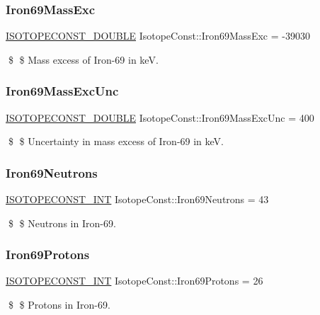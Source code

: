 \subsubsection{\texorpdfstring{Iron69\+Mass\+Exc}{Iron69MassExc}}
{\footnotesize\ttfamily \mbox{\hyperlink{group___isotope_const-_macros_ga8f45a7272ce02c0b4c65c44636ed719a}{I\+S\+O\+T\+O\+P\+E\+C\+O\+N\+S\+T\+\_\+\+D\+O\+U\+B\+LE}} Isotope\+Const\+::\+Iron69\+Mass\+Exc = -\/39030}

\$ \$ Mass excess of Iron-\/69 in keV. \mbox{\label{group___isotope_const-_iron-_fe69_ga04de5f66e578598bd93490f76d42a4e3}} 
\subsubsection{\texorpdfstring{Iron69\+Mass\+Exc\+Unc}{Iron69MassExcUnc}}
{\footnotesize\ttfamily \mbox{\hyperlink{group___isotope_const-_macros_ga8f45a7272ce02c0b4c65c44636ed719a}{I\+S\+O\+T\+O\+P\+E\+C\+O\+N\+S\+T\+\_\+\+D\+O\+U\+B\+LE}} Isotope\+Const\+::\+Iron69\+Mass\+Exc\+Unc = 400}

\$ \$ Uncertainty in mass excess of Iron-\/69 in keV. \mbox{\label{group___isotope_const-_iron-_fe69_ga3a6bb23cf686ee8bae5cb1d8ecaaf9b3}} 
\subsubsection{\texorpdfstring{Iron69\+Neutrons}{Iron69Neutrons}}
{\footnotesize\ttfamily \mbox{\hyperlink{group___isotope_const-_macros_ga5f18360b3e99483a35c32d789e62621c}{I\+S\+O\+T\+O\+P\+E\+C\+O\+N\+S\+T\+\_\+\+I\+NT}} Isotope\+Const\+::\+Iron69\+Neutrons = 43}

\$ \$ Neutrons in Iron-\/69. \mbox{\label{group___isotope_const-_iron-_fe69_ga88da3870d42d0789f1129b89ef78ef34}} 
\subsubsection{\texorpdfstring{Iron69\+Protons}{Iron69Protons}}
{\footnotesize\ttfamily \mbox{\hyperlink{group___isotope_const-_macros_ga5f18360b3e99483a35c32d789e62621c}{I\+S\+O\+T\+O\+P\+E\+C\+O\+N\+S\+T\+\_\+\+I\+NT}} Isotope\+Const\+::\+Iron69\+Protons = 26}

\$ \$ Protons in Iron-\/69. 